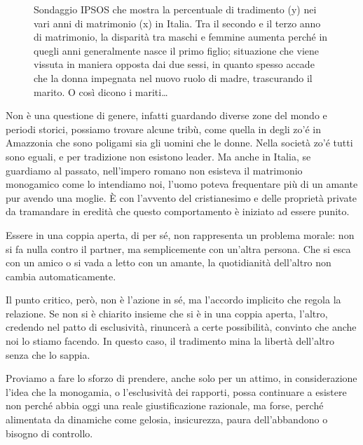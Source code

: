 \documentclass[12pt]{book} %
\begin{document}
\needspace{4cm}
\begin{figure}[H]
  \centering
  \caption{Sondaggio IPSOS che mostra la percentuale di tradimento (y) nei vari anni di matrimonio (x) in Italia. Tra il secondo e il terzo anno di matrimonio, la disparità tra maschi e femmine aumenta perché in quegli anni generalmente nasce il primo figlio; situazione che viene vissuta in maniera opposta dai due sessi, in quanto spesso accade che la donna impegnata nel nuovo ruolo di madre, trascurando il marito. O così dicono i mariti…}
\end{figure}

Non è una questione di genere, infatti guardando diverse zone del mondo e periodi storici, possiamo trovare alcune
tribù, come quella in degli zo'é in Amazzonia che sono poligami sia gli uomini che le donne. Nella
società zo'é tutti sono eguali, e per tradizione non esistono leader. Ma anche in Italia, se
guardiamo al passato, nell'impero romano non esisteva il matrimonio monogamico come lo intendiamo noi, l'uomo poteva
frequentare più di un amante pur avendo una moglie. È con l'avvento del cristianesimo e delle
proprietà private da tramandare in eredità che questo comportamento è iniziato ad essere punito. 

Essere in una coppia aperta, di per sé, non rappresenta un problema morale: non si fa nulla contro il partner, ma semplicemente con un’altra persona. Che si esca con un amico o si vada a letto con un amante, la quotidianità dell’altro non cambia automaticamente.

Il punto critico, però, non è l’azione in sé, ma l’accordo implicito che regola la relazione. Se non si è chiarito insieme che si è in una coppia aperta, l'altro, credendo nel patto di esclusività, rinuncerà a certe possibilità, convinto che anche noi lo stiamo facendo. In questo caso, il tradimento mina la libertà dell’altro senza che lo sappia.

Proviamo a fare lo sforzo di prendere, anche solo per un attimo, in considerazione l’idea che la monogamia, o l’esclusività dei rapporti, possa continuare a esistere non perché abbia oggi una reale giustificazione razionale, ma forse, perché alimentata da dinamiche come gelosia, insicurezza, paura dell’abbandono o bisogno di controllo.
\end{document}
